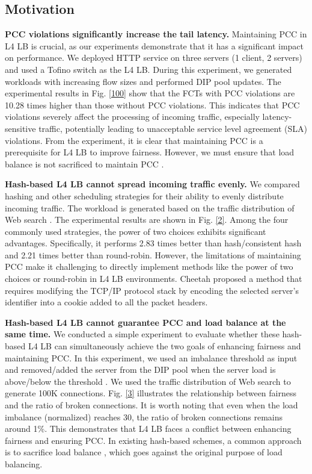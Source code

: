 \subsection{Motivation}
\textbf{PCC violations significantly increase the tail latency.} Maintaining PCC in L4 LB is crucial, as our experiments demonstrate that it has a significant impact on performance. We deployed HTTP service on three servers (1 client, 2 servers) and used a Tofino switch as the L4 LB. During this experiment, we generated workloads with increasing flow sizes and performed DIP pool updates. The experimental results in Fig. \ref{100} show that the FCTs with PCC violations are 10.28 times higher than those without PCC violations. This indicates that PCC violations severely affect the processing of incoming traffic, especially latency-sensitive traffic, potentially leading to unacceptable service level agreement (SLA) violations. From the experiment, it is clear that maintaining PCC is a prerequisite for L4 LB to improve fairness. However, we must ensure that load balance is not sacrificed to maintain PCC \cite{barbette2020high}.

\textbf{Hash-based L4 LB cannot spread incoming traffic evenly.} We compared hashing and other scheduling strategies for their ability to evenly distribute incoming traffic. The workload is generated based on the traffic distribution of Web search \cite{alizadeh2010data}. The experimental results are shown in Fig. \ref{2}. Among the four commonly used strategies, the power of two choices exhibits significant advantages. Specifically, it performs 2.83 times better than hash/consistent hash and 2.21 times better than round-robin. However, the limitations of maintaining PCC make it challenging to directly implement methods like the power of two choices or round-robin in L4 LB environments. Cheetah proposed a method that requires modifying the TCP/IP protocol stack by encoding the selected server’s identifier into a cookie added to all the packet headers.

\textbf{Hash-based L4 LB cannot guarantee PCC and load balance at the same time.} We conducted a simple experiment to evaluate whether these hash-based L4 LB can simultaneously achieve the two goals of enhancing fairness and maintaining PCC. In this experiment, we used an imbalance threshold as input and removed/added the server from the DIP pool when the server load is above/below the threshold \cite{barbette2021cheetah}. We used the traffic distribution of Web search to generate 100K connections. Fig. \ref{3} illustrates the relationship between fairness and the ratio of broken connections. It is worth noting that even when the load imbalance (normalized) reaches 30, the ratio of broken connections remains around 1\%. This demonstrates that L4 LB faces a conflict between enhancing fairness and ensuring PCC. In existing hash-based schemes, a common approach is to sacrifice load balance \cite{eisenbud2016maglev, olteanu2018stateless}, which goes against the original purpose of load balancing.

